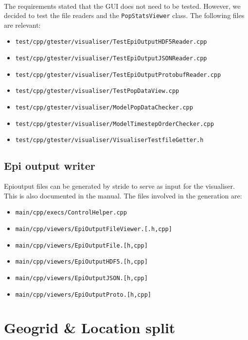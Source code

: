 \documentclass{article}
\begin{document}
\paragraph{} The requirements stated that the GUI does not need to be tested. However, we decided to test the file readers and the \texttt{PopStatsViewer} class. The following files are relevant:
\begin{itemize}
\item \texttt{test/cpp/gtester/visualiser/TestEpiOutputHDF5Reader.cpp}
\item \texttt{test/cpp/gtester/visualiser/TestEpiOutputJSONReader.cpp}
\item \texttt{test/cpp/gtester/visualiser/TestEpiOutputProtobufReader.cpp}
\item \texttt{test/cpp/gtester/visualiser/TestPopDataView.cpp}
\item \texttt{test/cpp/gtester/visualiser/ModelPopDataChecker.cpp}
\item \texttt{test/cpp/gtester/visualiser/ModelTimestepOrderChecker.cpp}
\item \texttt{test/cpp/gtester/visualiser/VisualiserTestfileGetter.h}
\end{itemize}

\subsection{Epi output writer}

Epioutput files can be generated by stride to serve as input for the visualiser. This is also documented in the manual. The files involved in the generation are:

\begin{itemize}
\item \texttt{main/cpp/execs/ControlHelper.cpp}
\item \texttt{main/cpp/viewers/EpiOutputFileViewer.[.h,cpp]}
\item \texttt{main/cpp/viewers/EpiOutputFile.[h,cpp]}
\item \texttt{main/cpp/viewers/EpiOutputHDF5.[h,cpp]}
\item \texttt{main/cpp/viewers/EpiOutputJSON.[h,cpp]}
\item \texttt{main/cpp/viewers/EpiOutputProto.[h,cpp]}
\end{itemize}

\section{Geogrid \& Location split}
\end{document}
